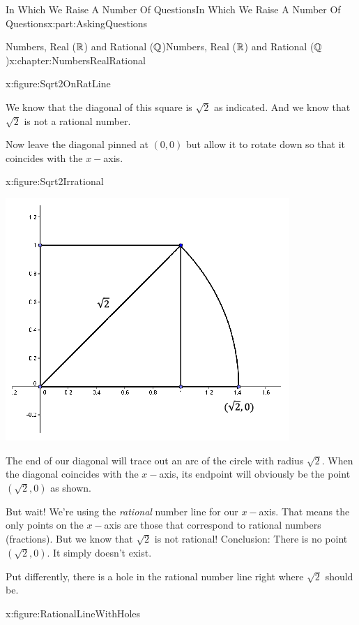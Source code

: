 \begin{partptx}{In Which We Raise A Number Of Questions}{}{In Which We Raise A Number Of Questions}{}{}{x:part:AskingQuestions}
\begin{chapterptx}{Numbers, Real (\(\mathbb {R}\)) and Rational (\(\mathbb {Q}\))}{}{Numbers, Real (\(\mathbb {R}\)) and Rational (\(\mathbb {Q}\))}{}{}{x:chapter:NumbersRealRational}
\begin{introduction}{}
\begin{figureptx}{}{x:figure:Sqrt2OnRatLine}{}
				\tcblower
			\end{figureptx}%
			We know that the diagonal of this square is \(\sqrt{2}\) as indicated. And we know that \(\sqrt{2}\) is not a rational number.%
			\par
			Now leave the diagonal pinned at \((0,0)\) but allow it to rotate down so that it coincides with the \(x-\)axis.%
			\begin{figureptx}{}{x:figure:Sqrt2Irrational}{}%
				\begin{image}{0.25}{0.5}{0.25}%
					\includegraphics[width=\linewidth]{external/images/Sqrt2Irrational.png}
				\end{image}%
				\tcblower
			\end{figureptx}%
			The end of our diagonal will trace out an arc of the circle with radius \(\sqrt{2}\). When the diagonal coincides with the \(x-\)axis, its endpoint will obviously be the point \((\sqrt{2}, 0)\) as shown.%
			\par
			But wait! We're using the \emph{rational} number line for our \(x-\)axis. That means the only points on the \(x-\)axis are those that correspond to rational numbers (fractions). But we know that \(\sqrt{2}\) is not rational! Conclusion: There is no point \((\sqrt{2},0)\). It simply doesn't exist.%
			\par
			Put differently, there is a hole in the rational number line right where \(\sqrt{2}\) should be.%
			\begin{figureptx}{}{x:figure:RationalLineWithHoles}{}%
				\begin{image}{0}{1}{0}%

\end{image}
\end{figureptx}
\end{introduction}
\end{chapterptx}
\end{partptx}
